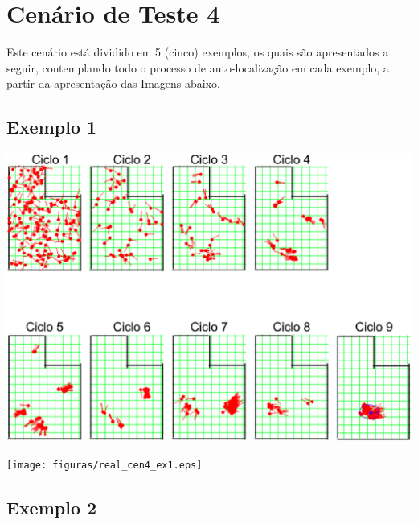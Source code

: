 \section{Cenário de Teste 4}

Este cenário está dividido em 5 (cinco) exemplos, os quais são apresentados a seguir, contemplando todo o processo de auto-localização
em cada exemplo, a partir da apresentação das Imagens abaixo.

\subsection{Exemplo 1}

{\centering
\includegraphics[scale=0.4]{figuras/cen4_ex1.eps}
\label{img:cen4_ex1}
\par}

{\centering
\texttt{[image: figuras/real\_cen4\_ex1.eps]}
\label{img:real_cen4_ex1}
\par}

\subsection{Exemplo 2}

